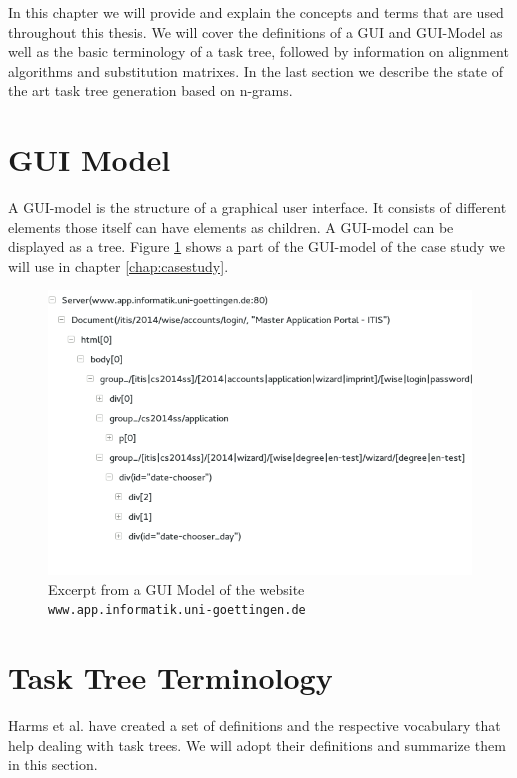 In this chapter we will provide and explain the concepts and terms that are used throughout this thesis.
We will cover the definitions of a GUI and GUI-Model as well as the basic terminology of a task tree, followed by
 information on alignment algorithms and substitution matrixes.
In the last section we describe the state of the art task tree generation based on n-grams\cite{harms2013}.


\section{GUI Model}
\label{sec:foundationguiandguimodel}
A GUI-model is the structure of a graphical user interface. It consists of different elements those itself can have elements as children.
A GUI-model can be displayed as a tree. Figure \ref{fig:guimodel} shows a part of the GUI-model of the case study we will use in chapter \ref{chap:casestudy}.
\begin{figure}
	\includegraphics[width=\textwidth]{chapters/foundations/guimodel.png}
	\caption{Excerpt from a GUI Model of the website \texttt{www.app.informatik.uni-goettingen.de}}
	\label{fig:guimodel}
\end{figure}


\section{Task Tree Terminology}
\label{sec:foundationtasktreeterminology}
Harms et al.\cite{harms2013} have created a set of definitions and the respective vocabulary that help dealing with task trees.
We will adopt their definitions and summarize them in this section.

